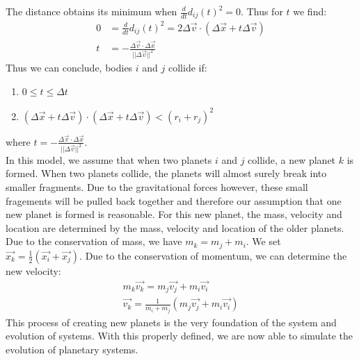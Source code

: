   The distance obtains its minimum when \(\frac{d}{dt}d_{ij}(t)^2=0\). Thus for \(t\) we find:
  \begin{align*}
  0&=\frac{d}{dt}d_{ij}(t)^2 =2\Delta\vec{v}\cdot(\Delta\vec{x}+t\Delta\vec{v})\\
  t&=-\frac{\Delta\vec{v}\cdot \Delta\vec{x}}{||\Delta \vec{v}||^2}
  \end{align*}
  Thus we can conclude, bodies \(i\) and \(j\) collide if:
 \begin{enumerate}
  \item \(0\leq t \leq \Delta t\) 
  \item \((\Delta\vec{x} +t\Delta\vec{v})\cdot(\Delta\vec{x} +t\Delta\vec{v}) <(r_i+r_j)^2\)
\end{enumerate} 
where \(t= -\frac{\Delta\vec{v}\cdot \Delta\vec{x}}{||\Delta \vec{v}||^2}\).\\
In this model, we assume that when two planets \(i\) and \(j\) collide, a new planet \(k\) is formed. When two planets collide, the planets will almost surely break into smaller fragments. 
Due to the gravitational forces however, these small fragements will be pulled back together and therefore our assumption that one new planet is formed is reasonable.
For this new planet, the mass, velocity and location are determined by the mass, velocity and location of the older planets. 
Due to the conservation of mass, we have \(m_k=m_j+m_i\). We set \(\vec{x_k}=\frac{1}{2}(\vec{x_i}+\vec{x_j})\). Due to the conservation of momentum, we can determine the new velocity: 
\begin{align*}
	m_k\vec{v_k}=m_j\vec{v_j}+m_i\vec{v_i}\\
	\vec{v_k}=\frac{1}{m_i+m_j}(m_j\vec{v_j}+m_i\vec{v_i})
\end{align*}
This process of creating new planets is the very foundation of the system and evolution of systems. With this properly defined, we are now able to simulate the evolution of planetary systems.

